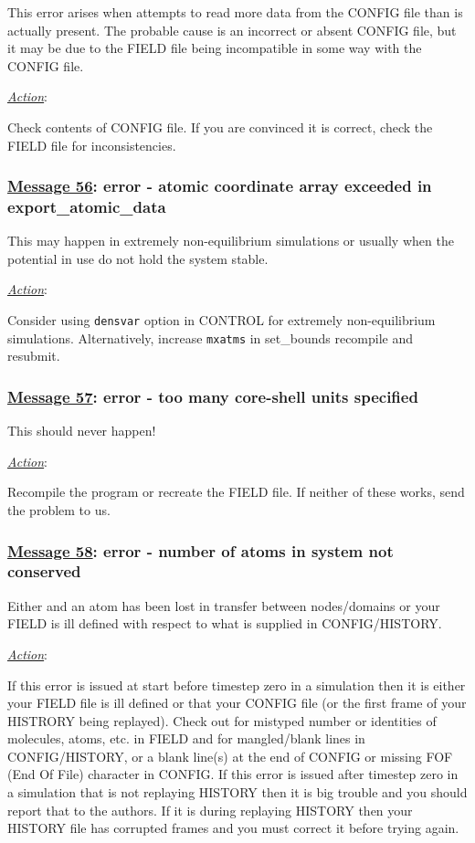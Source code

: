 This error arises when \D attempts to read more data from the
CONFIG file than is actually present.  The probable cause is an
incorrect or absent CONFIG file, but it may be due to the FIELD
file being incompatible in some way with the CONFIG file.

\noindent \underline{\em Action}:

Check contents of CONFIG file.  If you are convinced it is
correct, check the FIELD file for inconsistencies.

\subsubsection*{\underline{Message 56}: error - atomic coordinate array exceeded in export\_atomic\_data}

This may happen in extremely non-equilibrium simulations or
usually when the potential in use do not hold the system stable.

\noindent \underline{\em Action}:

Consider using {\tt densvar} option in CONTROL for extremely
non-equilibrium simulations.  Alternatively, increase {\tt mxatms}
in {\sc set\_bounds} recompile and resubmit.

\subsubsection*{\underline{Message 57}: error - too many core-shell units specified}

This should never happen!

\noindent \underline{\em Action}:

Recompile the program or recreate the FIELD file.  If neither of
these works, send the problem to us.

\subsubsection*{\underline{Message 58}: error - number of atoms in system not conserved}

Either and an atom has been lost in transfer between nodes/domains or your FIELD is ill defined with respect to what is supplied in CONFIG/HISTORY.

\noindent \underline{\em Action}:

If this error is issued at start before timestep zero in a simulation
then it is either your FIELD file is ill defined or that your CONFIG file
(or the first frame of your HISTRORY being replayed).  Check out for
mistyped number or identities of molecules, atoms, etc. in FIELD and for
mangled/blank lines in CONFIG/HISTORY, or a blank line(s) at the end of
CONFIG or missing FOF (End Of File) character in CONFIG.  If this error
is issued after timestep zero in a simulation that is not replaying
HISTORY then it is big trouble and you should report that to the authors.
If it is during replaying HISTORY then your HISTORY file has corrupted
frames and you must correct it before trying again.

